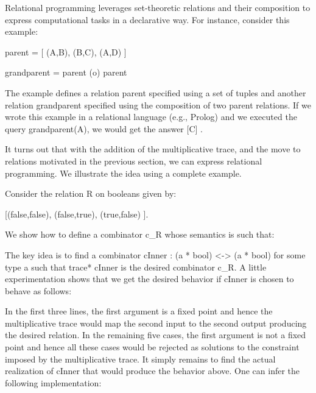 \documentclass{llncs}
\begin{document}
Relational programming leverages set-theoretic relations and their
composition to express computational tasks in a declarative way. For
instance, consider this example:

{{parent = {[ (A,B), (B,C), (A,D) ]} }}

{{grandparent = parent (o) parent}}

\noindent The example defines a relation {{parent}} specified using a
set of tuples and another relation {{grandparent}} specified using the
composition of two parent relations. If we wrote this example in a
relational language (e.g., Prolog) and we executed the query
{{grandparent(A)}}, we would get the answer {{ {[C]} }}.

It turns out that with the addition of the multiplicative trace, and
the move to relations motivated in the previous section, we can
express relational programming. We illustrate the idea using a
complete example. 

Consider the relation {{R}} on booleans given by:

{{ {[(false,false), (false,true), (true,false) ]}. }}

We show how to define a combinator {{c_R}} whose semantics is such that:


The key idea is to find a combinator {{cInner : (a * bool) <-> (a * bool)}}
for some type {{a}} such that {{trace* cInner}} is the desired combinator
{{c_R}}. A little experimentation shows that we get the desired behavior
if {{cInner}} is chosen to behave as follows:


In the first three lines, the first argument is a fixed point and hence the
multiplicative trace would map the second input to the second output
producing the desired relation. In the remaining five cases, the first
argument is not a fixed point and hence all these cases would be rejected as
solutions to the constraint imposed by the multiplicative trace. It simply
remains to find the actual realization of {{cInner}} that would produce the
behavior above. One can infer the following implementation:
\end{document}
